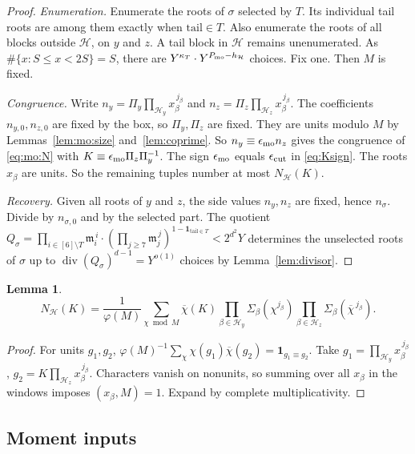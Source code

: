 \documentclass{amsart}
\newtheorem{lemma}{Lemma}[section]
\theoremstyle{definition}
\theoremstyle{plain}
\numberwithin{equation}{section}
\numberwithin{table}{section}
\begin{document}
\begin{proof}
\emph{Enumeration.} Enumerate the roots of $\sigma$ selected by $T$.
Its individual tail roots are among them exactly when $\mathrm{tail}\in T$.
Also enumerate the roots of all blocks outside $\mathcal H$, on $y$ and $z$. A tail block in $\mathcal H$
remains unenumerated. As $\#\{x:S\le x<2S\}=S$, there are
$Y^{\kappa_T}\cdot Y^{P_{\rm mo}-h_{\mathcal H}}$ choices. Fix one. Then $M$ is fixed.

\emph{Congruence.} Write $n_y=\Pi_y\prod_{\mathcal H_y}x_\beta^{\,j_\beta}$ and
$n_z=\Pi_z\prod_{\mathcal H_z}x_\beta^{\,j_\beta}$. The coefficients $n_{y,0},n_{z,0}$
are fixed by the box, so $\Pi_y,\Pi_z$ are fixed. They are units modulo $M$
by Lemmas~\ref{lem:mo:size} and~\ref{lem:coprime}. So
$n_y\equiv\epsilon_{\rm mo} n_z$ gives the congruence of
\eqref{eq:mo:N} with $K\equiv\epsilon_{\rm mo} \Pi_z\Pi_y^{-1}$. The sign
$\epsilon_{\rm mo}$ equals $\epsilon_{\rm cut}$ in \eqref{eq:Ksign}.
The roots $x_\beta$ are units. So the remaining tuples number at most
$N_{\mathcal H}(K)$.

\emph{Recovery.} Given all roots of $y$ and $z$, the side values $n_y,n_z$ are
fixed, hence $n_\sigma$. Divide by $n_{\sigma,0}$ and by the selected part. The
quotient $Q_\sigma=\prod_{i\in[6]\setminus T}\mathfrak m_i^{\,i}\cdot(\prod_{j\ge7}\mathfrak m_j^{\,j})^{1-\mathbf 1_{\mathrm{tail}\in T}}<2^{d^2}Y$
determines the unselected roots of $\sigma$ up to
$\operatorname{div}(Q_\sigma)^{d-1}=Y^{o(1)}$ choices by Lemma~\ref{lem:divisor}.
\end{proof}

\begin{lemma}\label{lem:mo:orth}
\[
 N_{\mathcal H}(K)=\frac1{\varphi(M)}\sum_{\chi\bmod M}\overline{\chi}(K)
 \prod_{\beta\in\mathcal H_y}\Sigma_\beta(\chi^{j_\beta})
 \prod_{\beta\in\mathcal H_z}\Sigma_\beta(\overline\chi^{\,j_\beta}).
\]
\end{lemma}

\begin{proof}
For units $g_1,g_2$,
$\varphi(M)^{-1}\sum_\chi\chi(g_1)\overline\chi(g_2)=\mathbf 1_{g_1\equiv g_2}$.
Take $g_1=\prod_{\mathcal H_y}x_\beta^{\,j_\beta}$,
$g_2=K\prod_{\mathcal H_z}x_\beta^{\,j_\beta}$. Characters vanish on nonunits,
so summing over all $x_\beta$ in the windows imposes $(x_\beta,M)=1$. Expand
by complete multiplicativity.
\end{proof}

\subsection{Moment inputs}\label{sec:mo:inputs}
\end{document}
